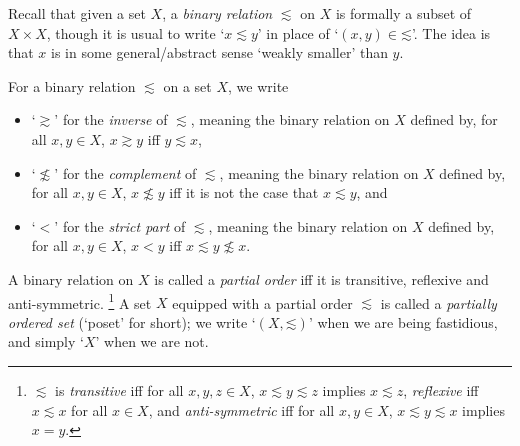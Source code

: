 Recall that given a set $X$, a \emph{binary relation} $\lesssim$ on $X$ is formally a subset of $X \times X$, though it is usual to write `$x \lesssim y$' in place of `$(x,y) \in \mathord{\lesssim}$'. The idea is that $x$ is in some general/abstract sense `weakly smaller' than $y$.

\begin{notation}
	\label{notation:relations}
	For a binary relation $\lesssim$ on a set $X$, we write
	\begin{itemize}

		\item `$\gtrsim$' for the \emph{inverse} of $\lesssim$, meaning the binary relation on $X$ defined by, for all $x,y \in X$, $x \gtrsim y$ iff $y \lesssim x$,

		\item `$\not\lesssim$' for the \emph{complement} of $\lesssim$, meaning the binary relation on $X$ defined by, for all $x,y \in X$, $x \not\lesssim y$ iff it is not the case that $x \lesssim y$, and

		\item `$<$' for the \emph{strict part} of $\lesssim$, meaning the binary relation on $X$ defined by, for all $x,y \in X$, $x < y$ iff $x \lesssim y \not\lesssim x$.

	\end{itemize}
\end{notation}

\begin{definition}
	\label{definition:poset}
	A binary relation on $X$ is called a \emph{partial order} iff it is transitive, reflexive and anti-symmetric.%
		\footnote{$\lesssim$ is \emph{transitive} iff for all $x,y,z \in X$, $x \lesssim y \lesssim z$ implies $x \lesssim z$, \emph{reflexive} iff $x \lesssim x$ for all $x \in X$, and \emph{anti-symmetric} iff for all $x,y \in X$, $x \lesssim y \lesssim x$ implies $x=y$.}
	A set $X$ equipped with a partial order $\lesssim$ is called a \emph{partially ordered set} (`poset' for short); we write `$(X,\mathord{\lesssim})$' when we are being fastidious, and simply `$X$' when we are not.
\end{definition}

